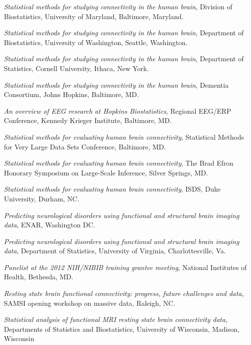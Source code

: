 \documentclass[12pt]{article}
\begin{document}
\begin{description}
\begin{description}
    \item {\it Statistical methods for studying connectivity in the
        human brain}, Division of Biostatistics, University of Maryland, Baltimore, Maryland.
    \item {\it Statistical methods for studying connectivity in the
        human brain}, Department of Biostatistics, University of Washington, Seattle, Washington.
    \item {\it Statistical methods for studying connectivity in the
        human brain}, Department of Statistics, Cornell University, Ithaca, New York. 	
     \item {\it Statistical methods for studying connectivity in the
        human brain}, Dementia Consortium, Johns Hopkins, Baltimore, MD.
    \item {\it An overview of EEG research at Hopkins Biostatistics}, Regional EEG/ERP Conference, 
      Kennedy Krieger Institute, Baltimore, MD.
    \item {\it Statistical methods for evaluating human brain connectivity}, Statistical Methods for Very Large Data Sets Conference, Baltimore, MD.
    \item {\it Statistical methods for evaluating human brain connectivity}, The Brad Efron Honorary Symposium on Large-Scale Inference, Silver Springs, MD.
    \item {\it Statistical methods for evaluating human brain connectivity}, ISDS, Duke University, Durham, NC.
\end{description}
\item[\textnormal{2012}]
    \begin{description}
      \item {\it Predicting neurological disorders using functional and structural brain imaging data}, ENAR, Washington DC.
\item {\it Predicting neurological disorders using functional and structural brain imaging data}, Department of Statistics, University of Virginia, Charlottesville, Va. 
\item {\it Panelist at the 2012 NIH/NIBIB training grantee meeting}, National Institutes of Health, Bethesda, MD.
\item {\it Resting state brain functional connectivity: progress, future challenges and data},
 SAMSI opening workshop on massive data, Raleigh, NC.
\item {\it Statistical analysis of functional MRI resting state brain connectivity data}, Departments of Statistics and Biostatistics, University of Wisconsin, Madison, Wisconsin

\end{description}
\end{description}
\end{document}
